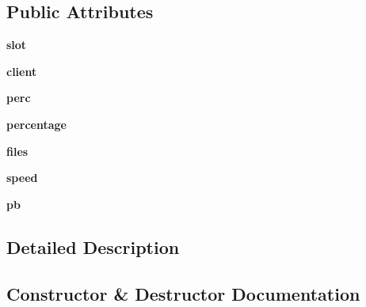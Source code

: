 \subsection*{Public Attributes}
\begin{DoxyCompactItemize}
\item 
{\bfseries slot}\hypertarget{classmonitor_1_1element_acfaf72105be355c577e7761fada58d52}{}\label{classmonitor_1_1element_acfaf72105be355c577e7761fada58d52}

\item 
{\bfseries client}\hypertarget{classmonitor_1_1element_ade6af57aec4f6964ba1ac2aa2e36ae87}{}\label{classmonitor_1_1element_ade6af57aec4f6964ba1ac2aa2e36ae87}

\item 
{\bfseries perc}\hypertarget{classmonitor_1_1element_a4b66c40dfa11b631fd48b15193098e4e}{}\label{classmonitor_1_1element_a4b66c40dfa11b631fd48b15193098e4e}

\item 
{\bfseries percentage}\hypertarget{classmonitor_1_1element_a9c6b0bf4d4e227e29a1af667b2ea4e5d}{}\label{classmonitor_1_1element_a9c6b0bf4d4e227e29a1af667b2ea4e5d}

\item 
{\bfseries files}\hypertarget{classmonitor_1_1element_a4ede729a55b617eac98c9c00e9a2024b}{}\label{classmonitor_1_1element_a4ede729a55b617eac98c9c00e9a2024b}

\item 
{\bfseries speed}\hypertarget{classmonitor_1_1element_ac411bb4b1567901178d6807fd2ee2036}{}\label{classmonitor_1_1element_ac411bb4b1567901178d6807fd2ee2036}

\item 
{\bfseries pb}\hypertarget{classmonitor_1_1element_aa6f87019ddf0f0a2a44f4e298285a5e2}{}\label{classmonitor_1_1element_aa6f87019ddf0f0a2a44f4e298285a5e2}

\end{DoxyCompactItemize}


\subsection{Detailed Description}
\begin{DoxyVerb}\end{DoxyVerb}
 

\subsection{Constructor \& Destructor Documentation}
